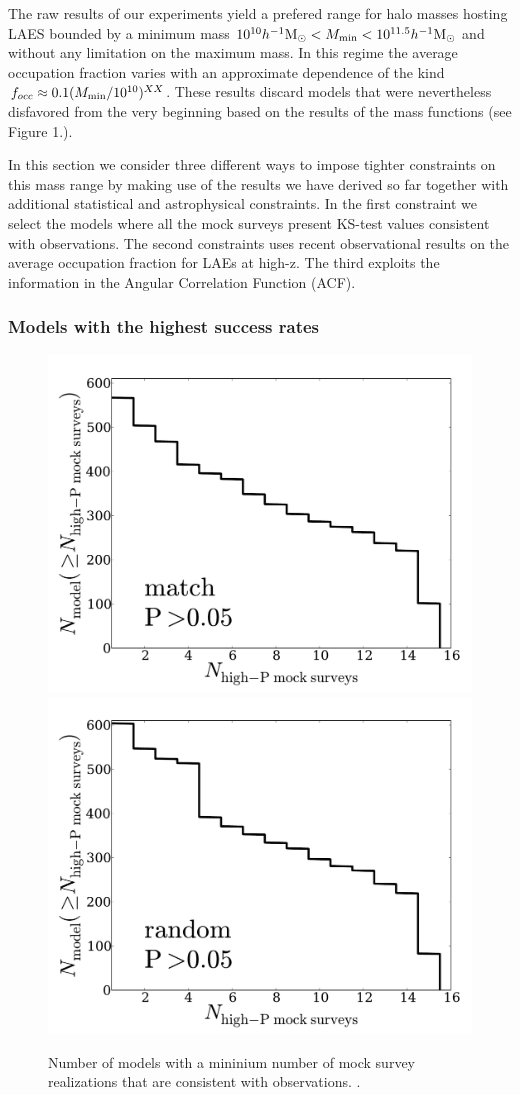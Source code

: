 \documentclass[usenatbib]{mn2e}
\newcommand{\hMsun}{{\ifmmode{h^{-1}{\rm {M_{\odot}}}}\else{$h^{-1}{\rm{M_{\odot}}}$}\fi}}
\begin{document}
The raw results of our experiments yield a prefered range for
halo masses hosting LAES bounded by a minimum mass $10^{10}\hMsun<M_{\rm
  min}<10^{11.5}\hMsun$ and without any limitation on the  maximum
mass. In this regime the average occupation fraction varies with an
approximate dependence of the kind $f_{occ}\approx 0.1 (M_{\rm
  min}/10^{10})^{XX}$. These results discard models that were
nevertheless disfavored from the very beginning based on the results
of the mass functions (see Figure 1.).  
 

In this section we consider three different ways to impose
tighter constraints on this mass range by making use of the results we
have derived so far together with additional statistical and
astrophysical constraints. In the first constraint we select the
models where all the mock surveys present KS-test values consistent
with observations. The second constraints uses recent observational
results on the average occupation fraction for LAEs at high-z. The
third exploits the information in the Angular Correlation Function
(ACF).  

\subsubsection{Models with the highest success rates}
\begin{figure}
\begin{center}
\includegraphics[width=0.46\linewidth,angle=0]{./plots/Fig4_match_P5.pdf}
\hspace{5mm}
\includegraphics[width=0.46\linewidth,angle=0]{./plots/Fig4_random_P5.pdf}
\end{center} 
\caption{ Number of models with a mininium number of mock survey
  realizations that are consistent with observations.
  \label{figure:high_success_rate}.}  
\end{figure}
\end{document}
